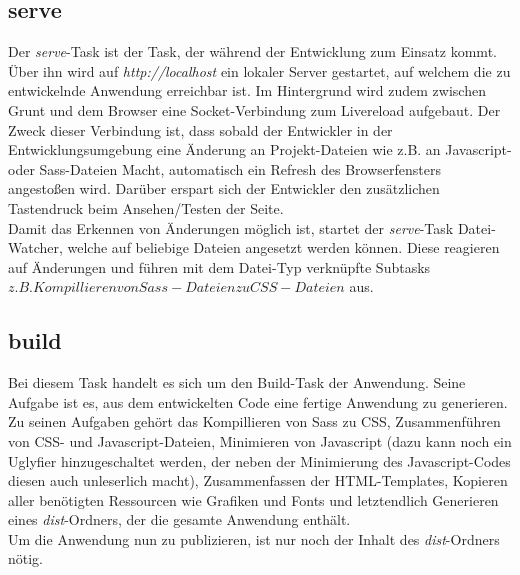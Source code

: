 \subsection{serve}
Der \textit{serve}-Task ist der Task, der während der Entwicklung zum Einsatz kommt. Über ihn wird auf \textit{http://localhost} ein lokaler Server gestartet, auf welchem
die zu entwickelnde Anwendung erreichbar ist. Im Hintergrund wird zudem zwischen Grunt und dem Browser eine Socket-Verbindung zum Livereload aufgebaut. Der Zweck dieser Verbindung ist,
dass sobald der Entwickler in der Entwicklungsumgebung eine Änderung an Projekt-Dateien wie z.B. an Javascript- oder Sass-Dateien Macht, automatisch ein Refresh des Browserfensters angestoßen wird.
Darüber erspart sich der Entwickler den zusätzlichen Tastendruck beim Ansehen/Testen der Seite.\\
Damit das Erkennen von Änderungen möglich ist, startet der \textit{serve}-Task Datei-Watcher, welche auf beliebige Dateien angesetzt werden können. Diese reagieren auf Änderungen und führen
mit dem Datei-Typ verknüpfte Subtasks \(z.B. Kompillieren von Sass-Dateien zu CSS-Dateien\) aus.

\subsection{build}
Bei diesem Task handelt es sich um den Build-Task der Anwendung. Seine Aufgabe ist es, aus dem entwickelten Code eine fertige Anwendung zu generieren.
Zu seinen Aufgaben gehört das Kompillieren von Sass zu CSS, Zusammenführen von CSS- und Javascript-Dateien, Minimieren von Javascript (dazu kann noch ein \glqq Uglyfier \grqq hinzugeschaltet werden, der neben
der Minimierung des Javascript-Codes diesen auch unleserlich macht), Zusammenfassen der HTML-Templates, Kopieren aller benötigten Ressourcen wie Grafiken und Fonts und letztendlich Generieren
eines \textit{dist}-Ordners, der die gesamte Anwendung enthält.\\
Um die Anwendung nun zu publizieren, ist nur noch der Inhalt des \textit{dist}-Ordners nötig.